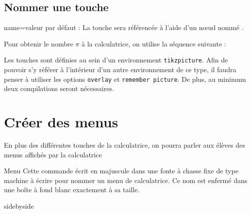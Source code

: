 \documentclass[10pt,french,a4paper]{article}
\begin{document}
\subsection{Nommer une touche}\label{subsec:NomTouche}

\begin{docKey}{name}{=}{valeur par défaut : }
    La touche sera référencée à l'aide d'un n{\oe}ud nommé .
\end{docKey}

\begin{dispExample}
Pour obtenir le nombre $\pi$ à la calculatrice, on utilise la séquence suivante :
\begin{center}
    \Touche[style=second]
    \Touche[principal={\Circonflexe},second={$\pi$},alpha={H},name=PI]
\end{center}
\end{dispExample}

Les touches sont définies au sein d'un environnement \texttt{tikzpicture}. Afin de pouvoir s'y référer à l'intérieur d'un autre environnement de ce type, il faudra penser à utiliser les options \texttt{overlay} et \texttt{remember picture}. De plus, au minimum deux compilations seront nécessaires.



\section{Créer des menus}

En plus des différentes touches de la calculatrice, on pourra parler aux élèves des menus affichés par la calculatrice

\begin{docCommand}{Menu}{}
    Cette commande écrit  en majuscule dans une fonte à chasse fixe de type {\ttfamily machine à écrire} pour nommer un menu de calculatrice. Ce nom est enfermé dans une boîte à fond blanc exactement à sa taille.
\end{docCommand}

\begin{dispExample*}{sidebyside}
   
\end{dispExample*}
\end{document}
